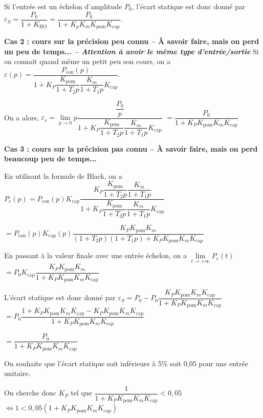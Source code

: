 Si l'entrée est un échelon d'amplitude $P_0$, l'écart statique est donc donné par 
$\varepsilon_S = \dfrac{P_0}{1+K_{\text{BO}}}= \dfrac{P_0}{1+K_p K_m K_{\text{pom}}K_{\text{cap}}}$.



\textbf{Cas 2 : cours sur la précision peu connu -- À savoir faire, mais on perd un peu de temps... \textit{-- Attention à avoir le même type d'entrée/sortie}}
Si on connait quand même un petit peu son cours, on a 
$\varepsilon(p)
=
\dfrac{P_{\text{con}}(p)}%
{1+K_P \dfrac{K_{\text{pom}}}{1+T_2 p} \dfrac{K_m}{1+T_1 p} K_{\text{cap}}}$.

On a alors,
$\varepsilon_s = \lim\limits_{p\to 0} p 
\dfrac{\dfrac{P_0}{p}}%
{1+K_P \dfrac{K_{\text{pom}}}{1+T_2 p} \dfrac{K_m}{1+T_1 p} K_{\text{cap}}}$
$=
\dfrac{P_0}%
{1+K_P K_{\text{pom}}K_m K_{\text{cap}}}
$

\textbf{Cas 3 : cours sur la précision pas connu -- À savoir faire, mais on perd beaucoup peu de temps...}

En utilisant la formule de Black, on a $P_e(p) 
= P_{\text{con}}(p) K_{\text{cap}} 
\dfrac{K_P \dfrac{K_{\text{pom}}}{1+T_2 p} \dfrac{K_m}{1+T_1 p} }%
{1+K_P \dfrac{K_{\text{pom}}}{1+T_2 p} \dfrac{K_m}{1+T_1 p} K_{\text{cap}}}$

$= P_{\text{con}}(p) K_{\text{cap}}(p) 
\dfrac{K_P K_{\text{pom}}K_m }%
{\left(1+T_2 p\right)\left(1+T_1 p\right)+K_P K_{\text{pom}} K_m K_{\text{cap}}}$

En passant à la valeur finale avec une entrée échelon, on a 
$\lim\limits_{t\to +\infty}P_e(t)$ $ =  P_{0} K_{\text{cap}} 
\dfrac{K_P K_{\text{pom}}K_m }%
{1+K_P K_{\text{pom}} K_m K_{\text{cap}}}$

L'écart statique est donc donné par
$
\varepsilon_S = P_0 - P_{0} 
\dfrac{K_P K_{\text{pom}}K_m K_{\text{cap}} }%
{1+K_P K_{\text{pom}} K_m K_{\text{cap}}}$
$= P_0
\dfrac{1+K_P K_{\text{pom}} K_m K_{\text{cap}} - K_P K_{\text{pom}}K_m K_{\text{cap}} }{1+K_P K_{\text{pom}} K_m K_{\text{cap}}}
$

$= 
\dfrac{P_0}{1+K_P K_{\text{pom}} K_m K_{\text{cap}}}$

\else 
\fi

\ifprof
On souhaite que l'écart statique soit inférieure à 5\% soit 0,05 pour une entrée unitaire. 

On cherche donc $K_P$ tel que 
$\dfrac{1}{1+K_P K_{\text{pom}} K_m K_{\text{cap}}}<0,05 $
$ \Leftrightarrow 1<0,05\left(1+K_P K_{\text{pom}} K_m K_{\text{cap}}\right)$

